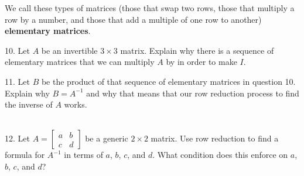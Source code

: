 \documentclass{article}
\begin{document}
We call these types of matrices (those that swap two rows, those that multiply a row by a number, and those that add a multiple of one row to another) \textbf{elementary matrices}.

10. Let $A$ be an invertible $3 \times 3$ matrix. Explain why there is a sequence of elementary matrices that we can multiply $A$ by in order to make $I$.

11. Let $B$ be the product of that sequence of elementary matrices in question 10. Explain why $B = A^{-1}$ and why that means that our row reduction process to find the inverse of $A$ works.

~\\

12. Let $\displaystyle A = \left[\begin{array}{cc}a& b \\ c& d\end{array}\right]$ be a generic $2 \times 2$ matrix. Use row reduction to find a formula for $A^{-1}$ in terms of $a$, $b$, $c$, and $d$. What condition does this enforce on $a$, $b$, $c$, and $d$?
\end{document}
